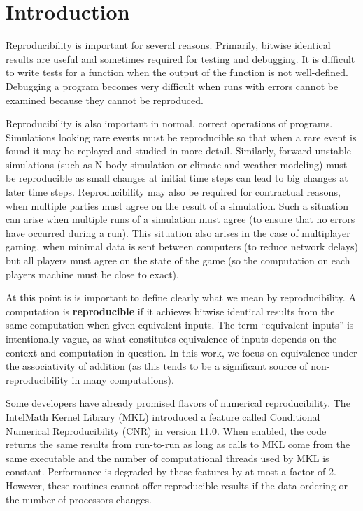 \section{Introduction}
  Reproducibility is important for several reasons. Primarily, bitwise identical results are useful and sometimes required for testing and debugging. It is difficult to write tests for a function when the output of the function is not well-defined. Debugging a program becomes very difficult when runs with errors cannot be examined because they cannot be reproduced.

  Reproducibility is also important in normal, correct operations of programs. Simulations looking rare events must be reproducible so that when a rare event is found it may be replayed and studied in more detail. Similarly, forward unstable simulations (such as N-body simulation or climate and weather modeling) must be reproducible as small changes at initial time steps can lead to big changes at later time steps. Reproducibility may also be required for contractual reasons, when multiple parties must agree on the result of a simulation. 
Such a situation can arise when multiple runs of a simulation must agree (to ensure that no errors have occurred during a run). This situation also arises in the case of multiplayer gaming, when minimal data is sent between computers (to reduce network delays) but all players must agree on the state of the game (so the computation on each players machine must be close to exact).

  At this point is is important to define clearly what we mean by reproducibility. A computation is \textbf{reproducible} if it achieves bitwise identical results from the same computation when given equivalent inputs. The term ``equivalent inputs'' is intentionally vague, as what constitutes equivalence of inputs depends on the context and computation in question. In this work, we focus on equivalence under the associativity of addition (as this tends to be a significant source of non-reproducibility in many computations). 

  Some developers have already promised flavors of numerical reproducibility. The Intel\textregistered Math Kernel Library (MKL) introduced a feature called Conditional Numerical Reproducibility (CNR) in version 11.0. \cite{MKL} When enabled, the code returns the same results from run-to-run as long as calls to MKL come from the same executable and the number of computational threads used by MKL is constant. Performance is degraded by these features by at most a factor of 2. However, these routines cannot offer reproducible results if the data ordering or the number of processors changes.

